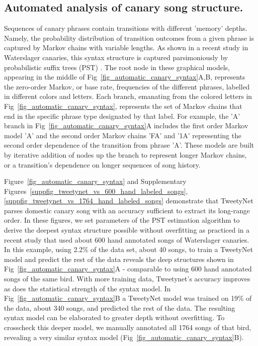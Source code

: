 \documentclass[10pt,letterpaper]{article}
\begin{document}
\subsection*{Automated analysis of canary song structure. }

Sequences of canary phrases contain transitions with different 'memory' depths. Namely, the probability distribution of transition outcomes from a given phrase is captured by Markov chains with variable lengths. As shown in a recent study in Waterslager canaries, this syntax structure is captured parsimoniously by probabilistic suffix trees (PST) \cite{ron_power_1996,markowitz_long-range_2013}. 
The root node in these graphical models, appearing in the middle of Fig~\ref{fig_automatic_canary_syntax}A,B, represents the zero-order Markov, or base rate, frequencies of the different phrases, labelled in different colors and letters. Each branch, emanating from the colored letters in Fig~\ref{fig_automatic_canary_syntax}, represents the set of Markov chains that end in the specific phrase type designated by that label. For example, the 'A' branch in Fig~\ref{fig_automatic_canary_syntax}A includes the first order Markov model 'A' and the second order Markov chains 'FA' and '1A' representing the second order dependence of the transition from phrase 'A'.
These models are built by iterative addition of nodes up the branch to represent longer Markov chains, or a transition's dependence on longer sequences of song history. 

Figure~\ref{fig_automatic_canary_syntax} and Supplementary Figures~\ref{suppfig_tweetynet_vs_600_hand_labeled_songs},\ref{suppfig_tweetynet_vs_1764_hand_labeled_songs} demonstrate that TweetyNet parses domestic canary song with an accuracy sufficient to extract its long-range order. In these figures, we set parameters of the PST estimation algorithm to derive the deepest syntax structure possible without overfitting as practiced in a recent study \cite{markowitz_long-range_2013} that used about 600 hand annotated songs of Waterslager canaries. In this example, using 2.2\% of the data set, about 40 songs, to train a TweetyNet model and predict the rest of the data reveals the deep structures shown in Fig~\ref{fig_automatic_canary_syntax}A - comparable to using 600 hand annotated songs of the same bird. With more training data, Tweetynet's accuracy improves as does the statistical strength of the syntax model. In Fig~\ref{fig_automatic_canary_syntax}B a TweetyNet model was trained on 19\% of the data, about 340 songs, and predicted the rest of the data. The resulting syntax model can be elaborated to greater depth without overfitting. To crosscheck this deeper model, we manually annotated all 1764 songs of that bird, revealing a very similar syntax model (Fig~\ref{fig_automatic_canary_syntax}B).
\end{document}
